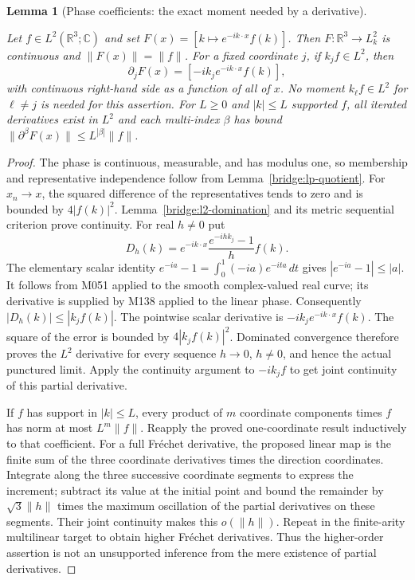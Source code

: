 \documentclass[11pt,a4paper]{article}
\newtheorem{lemma}[theorem]{Lemma}
\theoremstyle{definition}
\theoremstyle{remark}
\newcommand{\proofid}[1]{\par\smallskip{\normalfont\scriptsize\color{inkblue}Stable ID: \nolinkurl{#1}}\par\smallskip}
\begin{document}
\begin{lemma}[Phase coefficients: the exact moment needed by a derivative]
\label{bridge:phase-derivative}
\proofid{bridge:phase-derivative}
\par{}\par\smallskip
Let $f\in L^2(\mathbb R^3;\mathbb C)$ and set
$F(x)=[k\mapsto e^{-ik\cdot x}f(k)]$.
Then $F:\mathbb R^3\to L^2_k$ is continuous and $\|F(x)\|=\|f\|$.
For a fixed coordinate $j$, if $k_jf\in L^2$, then
\[
 \partial_jF(x)=[-ik_je^{-ik\cdot x}f(k)],
\]
with continuous right-hand side as a function of all of $x$.
No moment $k_\ell f\in L^2$ for $\ell\ne j$ is needed for this assertion.
For $L\geq0$ and $|k|\leq L$ supported $f$, all iterated derivatives exist in $L^2$
and each multi-index $\beta$ has bound
$\|\partial^\beta F(x)\|\leq L^{|\beta|}\|f\|$.
\end{lemma}
\begin{proof}
The phase is continuous, measurable, and has modulus one, so membership
and representative independence follow from
Lemma~\ref{bridge:lp-quotient}. For $x_n\to x$, the squared difference
of the representatives tends to zero and is bounded by $4|f(k)|^2$.
Lemma~\ref{bridge:l2-domination} and its metric sequential criterion
prove continuity. For real $h\ne0$ put
\[
 D_h(k)=e^{-ik\cdot x}\frac{e^{-ihk_j}-1}{h}f(k).
\]
The elementary scalar identity
$e^{-ia}-1=\int_0^1(-ia)e^{-ita}\,dt$ gives
$|e^{-ia}-1|\leq|a|$. It follows from M051 applied to the smooth
complex-valued real curve; its derivative is supplied by M138 applied to the linear phase. Consequently $|D_h(k)|\leq|k_jf(k)|$.
The pointwise scalar derivative is $-ik_je^{-ik\cdot x}f(k)$.
The square of the error is bounded by $4|k_jf(k)|^2$.
Dominated convergence therefore proves the $L^2$ derivative for every
sequence $h\to0$, $h\ne0$, and hence the actual punctured limit.
Apply the continuity argument to $-ik_jf$ to get joint continuity of
this partial derivative.

If $f$ has support in $|k|\leq L$, every product of $m$ coordinate
components times $f$ has norm at most $L^m\|f\|$. Reapply the proved
one-coordinate result inductively to that coefficient. For a full
Fr\'echet derivative, the proposed linear map is the finite sum of the
three coordinate derivatives times the direction coordinates. Integrate
along the three successive coordinate segments to express the increment;
subtract its value at the initial point and bound the remainder by
$\sqrt3\|h\|$ times the maximum oscillation of the partial derivatives
on these segments. Their joint continuity makes this $o(\|h\|)$.
Repeat in the finite-arity multilinear target to obtain higher
Fr\'echet derivatives. Thus the higher-order assertion is not an
unsupported inference from the mere existence of partial derivatives.
\end{proof}
\end{document}
